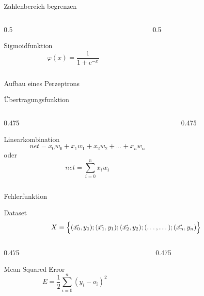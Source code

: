 \documentclass[aspectratio=169,usepdftitle=true]{beamer}
\newcommand\twosplit[3][c]{%
\begin{columns}[#1]
\begin{column}{0.475\linewidth}#2\end{column}\hfill
\begin{column}{0.475\linewidth}#3\end{column}
\end{columns}}
\begin{document}
\begin{frame}{Zahlenbereich begrenzen}
\begin{layout-imageonly}
\begin{columns}[c]
\begin{column}{0.5\linewidth}
\begin{block}{Sigmoidfunktion}
\[\varphi(x)=\frac{1}{1+e^{-x}}\]
\centering
{}
\end{block}
\end{column}
\begin{column}{0.5\linewidth}
\centering
\resizebox{!}{0.8\textheight}{
\neuralnetworkSingleNeuron
}
\end{column}
\end{columns}
\end{layout-imageonly}
\end{frame}

\begin{frame}{Aufbau eines Perzeptrons}
    \begin{layout-imageonly}
    \centering
    \perceptron
    \end{layout-imageonly}
\end{frame}

\begin{frame}{Übertragungsfunktion}
\begin{layout-full}
\twosplit{
\begin{block}{Linearkombination}
    \[net = x_0w_{0} + x_1w_{1} + x_2w_{2} + ... + x_nw_{n}\]
    \centering oder
    \[net = \sum_{i=0}^{n} {x_iw_{i}} \]
\end{block}
}{
\centering
\resizebox{\linewidth}{!}{
\perceptronFirstHalf
}
}
\end{layout-full}
\end{frame}




\begin{frame}{Fehlerfunktion}
\begin{layout-full}
\begin{block}{Dataset}
\[
  X = \Bigl\{(\vec{x_0}, y_0);(\vec{x_1}, y_1);(\vec{x_2}, y_2);(\dots, \dots);(\vec{x_n}, y_n)\Bigl\}
\]
\end{block}
\twosplit{
\begin{block}{Mean Squared Error}
\[E=\frac{1}{2}\sum_{i=0}^{n}(y_i-o_i)^2\]
\end{block}
}{
\centering
\resizebox{\linewidth}{!}{
\perceptron
}
}
\end{layout-full}
\end{frame}
\end{document}

